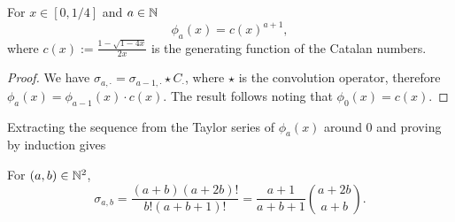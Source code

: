  \begin{myprop}
    For $x\in [0,1/4]$ and $a\in \mathbb{N}$ 
    $$\phi_a(x)=c(x)^{a+1},$$
    where $c(x):=\frac{1-\sqrt{1-4x}}{2x}$ is the generating function of the Catalan numbers.
 \end{myprop}
 \begin{proof}
    We have $\sigma_{a,\cdot}=\sigma_{a-1,\cdot}\star C_\cdot$, where $\star$ is the convolution operator, therefore $\phi_a(x)=\phi_{a-1}(x)\cdot c(x)$. The result follows noting that $\phi_0(x)=c(x)$.
 \end{proof}
 
Extracting the sequence from the Taylor series of $\phi_a(x)$ around 0 and proving by induction gives
 \begin{myprop}
    \label{enum-sigma}
    For $(a,b)\in\mathbb{N}^2$,
    $$\sigma_{a,b}=\frac{(a+b)(a+2b)!}{b!(a+b+1)!}=\frac{a+1}{a+b+1}{a+2b\choose a+b}.$$
 \end{myprop}


